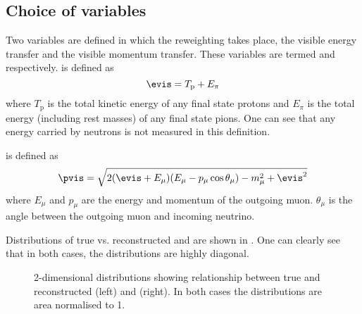 \subsection{Choice of variables}

Two variables are defined in which the reweighting takes place, the visible energy transfer and the visible momentum transfer. 
These variables are termed \evis and \pvis respectively.
\evis is defined as 
\begin{equation}
	\evis = T_{\textrm{p}} + E_{\pi}
\end{equation}
where $T_{\textrm{p}}$ is the total kinetic energy of any final state protons and $E_{\pi}$ is the total energy (including rest masses) of any final state pions.
One can see that any energy carried by neutrons is not measured in this definition.

\pvis is defined as
\begin{equation}
	\pvis = \sqrt{ 2(\evis + E_{\mu})(E_{\mu} - p_{\mu}\cos\theta_{\mu}) - m_{\mu}^{2} + \evis^{2} }
\end{equation}
where $E_{\mu}$ and $p_{\mu}$ are the energy and momentum of the outgoing muon.
$\theta_{\mu}$ is the angle between the outgoing muon and incoming neutrino.

Distributions of true vs. reconstructed \evis and \pvis are shown in .
One can clearly see that in both cases, the distributions are highly diagonal.

\begin{figure}[h]
	\begin{minipage}[t]{.5\linewidth}
		\begin{adjustbox}{max totalsize=\linewidth, center}
			
		\end{adjustbox}	
	\end{minipage}
	\hfill
	\begin{minipage}[t]{.5\linewidth}
		\begin{adjustbox}{max totalsize=\linewidth, center}
			
		\end{adjustbox}
	\end{minipage}
	\caption[True vs. reconstructed \evis (left) and \pvis (right)]{2-dimensional distributions showing relationship between true and reconstructed \evis (left) and \pvis (right). In both cases the distributions are area normalised to 1.}
	\label{fig:visibleTrueReco}
\end{figure}

